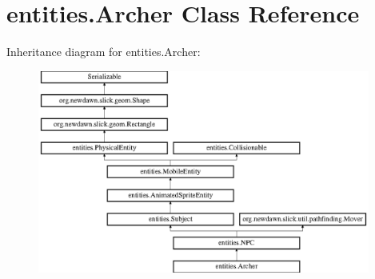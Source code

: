 \hypertarget{classentities_1_1_archer}{}\section{entities.\+Archer Class Reference}
\label{classentities_1_1_archer}
Inheritance diagram for entities.\+Archer\+:\begin{figure}[H]
\begin{center}
\leavevmode
\includegraphics[height=6.666667cm]{classentities_1_1_archer}
\end{center}
\end{figure}
